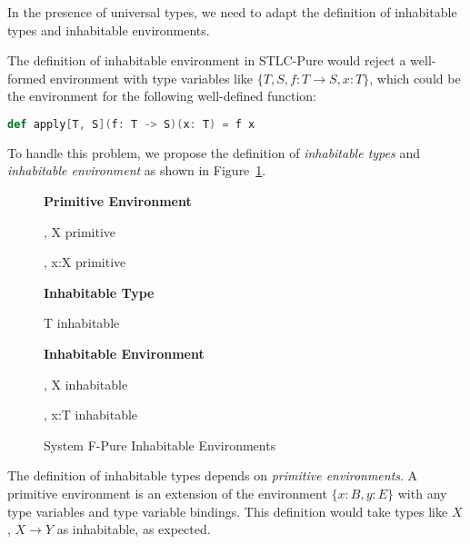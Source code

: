 In the presence of universal types, we need to adapt the definition of
inhabitable types and inhabitable environments.

The definition of inhabitable environment in STLC-Pure would reject a
well-formed environment with type variables like
$\{T, S, f: T \to S, x:T\}$, which could be the environment for
the following well-defined function:

\begin{lstlisting}[language=Scala]
  def apply[T, S](f: T -> S)(x: T) = f x
\end{lstlisting}

To handle this problem, we propose the definition of \emph{inhabitable
  types} and \emph{inhabitable environment} as shown in
Figure~\ref{fig:f-pure-inhabitability}.

\begin{figure}[h]
\begin{framed}

\setlength{\columnseprule}{0.4pt}
\begin{multicols}{2}

\textbf{Primitive Environment}


{ \Sigma ,\; X \quad primitive }

{ \Sigma ,\; x:X \quad primitive }

\textbf{Inhabitable Type}

{ T \quad inhabitable }

\columnbreak

\textbf{Inhabitable Environment}


{ \Gamma ,\; X \quad inhabitable }

{ \Gamma ,\; x:T \quad inhabitable }

\end{multicols}
\end{framed}

\caption{System F-Pure Inhabitable Environments }
\label{fig:f-pure-inhabitability}
\end{figure}

The definition of inhabitable types depends on \emph{primitive
  environments}. A primitive environment is an extension of the
environment $\{x:B, y:E\}$ with any type variables and type variable
bindings. This definition would take types like $X$, $X \to Y$ as
inhabitable, as expected.

